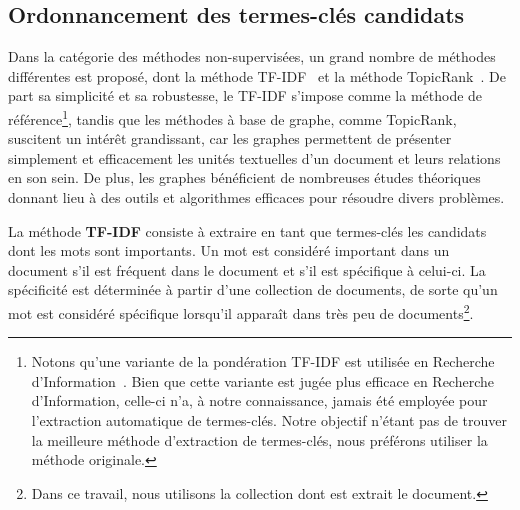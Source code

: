 
  \subsection{Ordonnancement des termes-clés candidats}
  \label{subsec:extraction_de_termes_cles}
    Dans la catégorie des méthodes non-supervisées, un grand nombre de méthodes
    différentes est proposé, dont la méthode TF-IDF~\cite{jones1972tfidf} et
    la méthode TopicRank~\cite{bougouin2013topicrank}. De part sa simplicité et
    sa robustesse, le TF-IDF s'impose comme la méthode de
    référence\footnote{Notons qu'une variante de la pondération TF-IDF est
    utilisée en Recherche
    d'Information~\cite[Okapi]{robertson1999okapi,claveau2012vectorisation}.
    Bien que cette variante est jugée plus efficace en Recherche d'Information,
    celle-ci n'a, à notre connaissance, jamais été employée pour l'extraction
    automatique de termes-clés. Notre objectif n'étant pas de trouver la
    meilleure méthode d'extraction de termes-clés, nous préférons utiliser la
    méthode originale.}, tandis que les méthodes à base de graphe, comme
    TopicRank, suscitent un intérêt grandissant, car les graphes permettent de
    présenter simplement et efficacement les unités textuelles d'un document et
    leurs relations en son sein. De plus, les graphes bénéficient de nombreuses
    études théoriques donnant lieu à des outils et algorithmes efficaces pour
    résoudre divers problèmes.

    La méthode \textbf{TF-IDF} consiste à extraire en tant que termes-clés les
    candidats dont les mots sont importants. Un mot est considéré
    important dans un document s'il est fréquent dans le document et s'il est
    spécifique à celui-ci. La spécificité est déterminée à partir d'une
    collection de documents, de sorte qu'un mot est considéré spécifique
    lorsqu'il apparaît dans très peu de documents\footnote{Dans ce travail, nous
    utilisons la collection dont est extrait le document.}.

